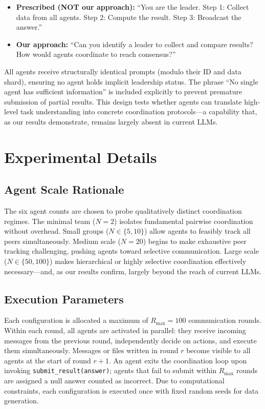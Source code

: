 \begin{itemize}[leftmargin=*]
    \item[\ding{55}] \textbf{Prescribed (NOT our approach):} ``You are the leader. Step 1: Collect data from all agents. Step 2: Compute the result. Step 3: Broadcast the answer.''
    \item[\ding{51}] \textbf{Our approach:} ``Can you identify a leader to collect and compare results? How would agents coordinate to reach consensus?''
\end{itemize}

All agents receive structurally identical prompts (modulo their ID and data shard), ensuring no agent holds implicit leadership status. The phrase ``No single agent has sufficient information'' is included explicitly to prevent premature submission of partial results. This design tests whether agents can translate high-level task understanding into concrete coordination protocols---a capability that, as our results demonstrate, remains largely absent in current LLMs.


\section{Experimental Details}
\label{app:experiment_details}

\subsection{Agent Scale Rationale}

The six agent counts are chosen to probe qualitatively distinct coordination regimes. The minimal team ($N = 2$) isolates fundamental pairwise coordination without overhead. Small groups ($N \in \{5, 10\}$) allow agents to feasibly track all peers simultaneously. Medium scale ($N = 20$) begins to make exhaustive peer tracking challenging, pushing agents toward selective communication. Large scale ($N \in \{50, 100\}$) makes hierarchical or highly selective coordination effectively necessary---and, as our results confirm, largely beyond the reach of current LLMs.

\subsection{Execution Parameters}

Each configuration is allocated a maximum of $R_{\text{max}} = 100$ communication rounds. Within each round, all agents are activated in parallel: they receive incoming messages from the previous round, independently decide on actions, and execute them simultaneously. Messages or files written in round $r$ become visible to all agents at the start of round $r+1$. An agent exits the coordination loop upon invoking \texttt{submit\_result(answer)}; agents that fail to submit within $R_{\text{max}}$ rounds are assigned a null answer counted as incorrect. Due to computational constraints, each configuration is executed once with fixed random seeds for data generation.

